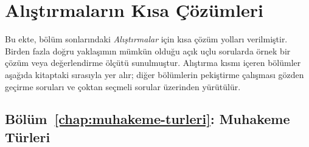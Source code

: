 \chapter{Alıştırmaların Kısa Çözümleri}

Bu ekte, bölüm sonlarındaki \emph{Alıştırmalar} için kısa çözüm yolları verilmiştir. Birden fazla doğru yaklaşımın mümkün olduğu açık uçlu sorularda örnek bir çözüm veya değerlendirme ölçütü sunulmuştur. Alıştırma kısmı içeren bölümler aşağıda kitaptaki sırasıyla yer alır; diğer bölümlerin pekiştirme çalışması gözden geçirme soruları ve çoktan seçmeli sorular üzerinden yürütülür.

\section{Bölüm~\ref{chap:muhakeme-turleri}: Muhakeme Türleri}

